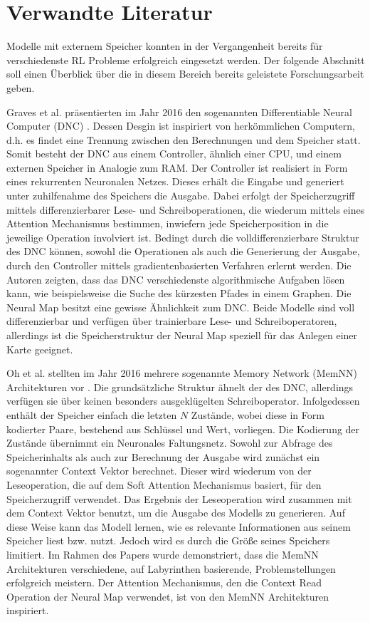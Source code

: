 \chapter{Verwandte Literatur}

Modelle mit externem Speicher konnten in der Vergangenheit bereits für verschiedenste RL Probleme erfolgreich eingesetzt werden. Der folgende Abschnitt soll einen Überblick über die in diesem Bereich bereits geleistete Forschungsarbeit geben.

Graves et al. präsentierten im Jahr 2016 den sogenannten Differentiable Neural Computer (DNC) \cite{DNC}. Dessen Desgin ist inspiriert von herkömmlichen Computern, d.h. es findet eine Trennung zwischen den Berechnungen und dem Speicher statt. Somit besteht der DNC aus einem Controller, ähnlich einer CPU, und einem externen Speicher in Analogie zum RAM. Der Controller ist realisiert in Form eines rekurrenten Neuronalen Netzes. Dieses erhält die Eingabe und generiert unter zuhilfenahme des Speichers die Ausgabe. Dabei erfolgt der Speicherzugriff mittels differenzierbarer Lese- und Schreiboperationen, die wiederum mittels eines Attention Mechanismus bestimmen, inwiefern jede Speicherposition in die jeweilige Operation involviert ist. Bedingt durch die volldifferenzierbare Struktur des DNC können, sowohl die Operationen als auch die Generierung der Ausgabe, durch den Controller mittels gradientenbasierten Verfahren erlernt werden. Die Autoren zeigten, dass das DNC verschiedenste algorithmische Aufgaben lösen kann, wie beispielsweise die Suche des kürzesten Pfades in einem Graphen. Die Neural Map besitzt eine gewisse Ähnlichkeit zum DNC. Beide Modelle sind voll differenzierbar und verfügen über trainierbare Lese- und Schreiboperatoren, allerdings ist die Speicherstruktur der Neural Map speziell für das Anlegen einer Karte geeignet.

Oh et al. stellten im Jahr 2016 mehrere sogenannte Memory Network (MemNN) Architekturen vor \cite{MemNN}. Die grundsätzliche Struktur ähnelt der des DNC, allerdings verfügen sie über keinen besonders ausgeklügelten Schreiboperator. Infolgedessen enthält der Speicher einfach die letzten $N$ Zustände, wobei diese in Form kodierter Paare, bestehend aus Schlüssel und Wert, vorliegen. Die Kodierung der Zustände übernimmt ein Neuronales Faltungsnetz. Sowohl zur Abfrage des Speicherinhalts als auch zur Berechnung der Ausgabe wird zunächst ein sogenannter Context Vektor berechnet. Dieser wird wiederum von der Leseoperation, die auf dem Soft Attention Mechanismus basiert, für den Speicherzugriff verwendet. Das Ergebnis der Leseoperation wird zusammen mit dem Context Vektor benutzt, um die Ausgabe des Modells zu generieren. Auf diese Weise kann das Modell lernen, wie es relevante Informationen aus seinem Speicher liest bzw. nutzt. Jedoch wird es durch die Größe seines Speichers limitiert. Im Rahmen des Papers wurde demonstriert, dass die MemNN Architekturen verschiedene, auf Labyrinthen basierende, Problemstellungen erfolgreich meistern. Der Attention Mechanismus, den die Context Read Operation der Neural Map verwendet, ist  von den MemNN Architekturen inspiriert.

